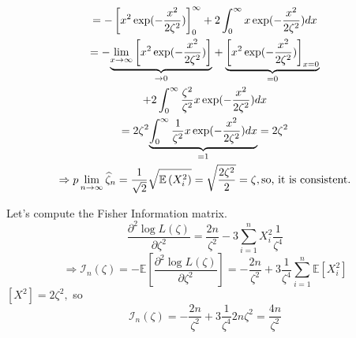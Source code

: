 \documentclass[notes=show]{beamer}
\begin{document}
\begin{frame}%

\begin{example}[Rayleigh]
\begin{gather*}
=-\left[ x^{2}\exp (-\frac{x^{2}}{2\zeta ^{2}})\right] _{0}^{\infty
}+2\int_{0}^{\infty }x\exp (-\frac{x^{2}}{2\zeta ^{2}})dx \\
=-\underset{\rightarrow 0}{\underbrace{\lim_{x\rightarrow \infty }\left[
x^{2}\exp (-\frac{x^{2}}{2\zeta ^{2}})\right] }}+\underset{=0}{\underbrace{%
\left[ x^{2}\exp (-\frac{x^{2}}{2\zeta ^{2}})\right] _{x=0}}} \\
+2\int_{0}^{\infty }\frac{\zeta ^{2}}{\zeta ^{2}}x\exp (-\frac{x^{2}}{2\zeta
^{2}})dx \\
=2\zeta ^{2}\underset{=1}{\underbrace{\int_{0}^{\infty }\frac{1}{\zeta ^{2}}%
x\exp (-\frac{x^{2}}{2\zeta ^{2}})dx}}=2\zeta ^{2} \\
\Rightarrow p\lim_{n\rightarrow \infty }\widehat{\zeta }_{n}=\frac{1}{\sqrt{2%
}}\sqrt{\mathbb{E}\left( X_{i}^{2}\right) }=\sqrt{\frac{2\zeta ^{2}}{2}}%
=\zeta ,\text{so, it is consistent.}
\end{gather*}
\end{example}

\end{frame}%

\begin{frame}%

\begin{example}[Rayleigh]
Let's compute the Fisher Information matrix. 
\begin{equation*}
\frac{\partial ^{2}\log L(\zeta )}{\partial \zeta ^{2}}=\frac{2n}{\zeta ^{2}}%
-3\sum_{i=1}^{n}X_{i}^{2}\frac{1}{\zeta ^{4}}
\end{equation*}%
\begin{equation*}
\Longrightarrow \mathcal{I}_{n}(\zeta )=-\mathbb{E}\left[ \frac{\partial
^{2}\log L(\zeta )}{\partial \zeta ^{2}}\right] =-\frac{2n}{\zeta ^{2}}+3%
\frac{1}{\zeta ^{4}}\sum_{i=1}^{n}\mathbb{E}[X_{i}^{2}]
\end{equation*}%
$[X^{2}]=2\zeta ^{2},$ so%
\begin{equation*}
\mathcal{I}_{n}(\zeta )=-\frac{2n}{\zeta ^{2}}+3\frac{1}{\zeta ^{4}}2n\zeta
^{2}=\frac{4n}{\zeta ^{2}}
\end{equation*}
\end{example}

\end{frame}%
\end{document}

